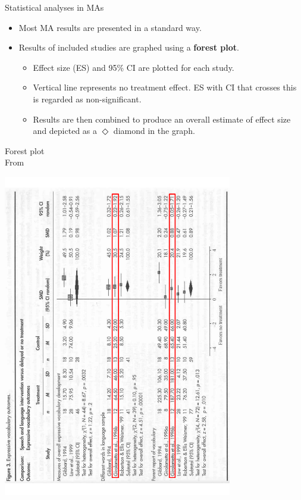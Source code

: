 \documentclass{beamer}
\begin{document}
% 
\begin{frame}{Statistical analyses in MAs}
	\begin{itemize}
	\item Most MA results are presented in a standard way.
	\item Results of \alert{included studies} are graphed using a \textbf{forest plot}. 
		\begin{itemize}
		\item Effect size (ES) and 95\% CI are plotted for each study.
		\item Vertical line represents \alert{no treatment effect}. ES with CI that crosses this is regarded as non-significant.
		\item Results are then combined to produce an \alert{overall estimate of effect size} and depicted as a $\Diamond$ diamond in the graph.
		\end{itemize}
	\end{itemize}
\end{frame}

% 
\begin{frame}{Forest plot  \\ \scriptsize{From \citet[p. 3]{Law2004a}}}
\begin{center}
\includegraphics[angle=270, origin=c, width=10cm]{images/law_fig3a.pdf}
\end{center}
\end{frame}
\end{document}

